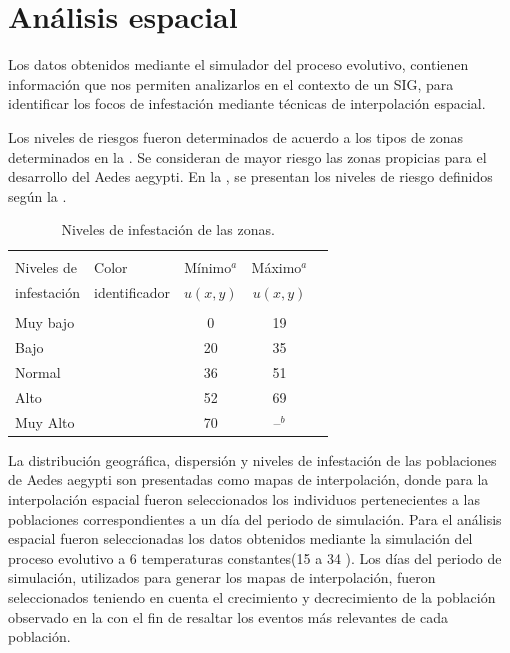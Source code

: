 \section {Análisis espacial}

Los datos obtenidos mediante el simulador del proceso evolutivo, contienen información que nos
permiten analizarlos en el contexto de un SIG, para identificar los focos de infestación mediante
técnicas de interpolación espacial.

Los niveles de riesgos fueron determinados de acuerdo a los tipos de zonas determinados en la
. Se consideran de mayor riesgo las zonas propicias para el
desarrollo del Aedes aegypti. En la , se presentan los niveles de
riesgo definidos según la .


\begin{table}[!hptb]
    \begin{minipage}{\textwidth}
\begin{center}
    \caption{\label{tab:niveles-riesgo-zonas} Niveles de infestación de las zonas.}
    \begin{tabular}{p{3cm} l c c c}
        \hline \\
         Niveles de  & Color & Mínimo$^a$ & Máximo$^a$ \\
         infestación & identificador & $u(x,y)$   & $u(x,y)$  \\
        \hline
        \hline\\
        Muy bajo  & \cellcolor{muybajo}& 0  & 19 \\
        Bajo    & \cellcolor{bajo}& 20 & 35 \\
        Normal & \cellcolor{normal}& 36 & 51 \\
        Alto   & \cellcolor{alto}& 52 & 69 \\
        Muy Alto & \cellcolor{muyalto} & 70 & --$^b$\\
    \end{tabular}
\end{center}
    \end{minipage}
\end{table}

La distribución geográfica, dispersión y niveles de infestación de las poblaciones de Aedes aegypti
son presentadas como mapas de interpolación, donde para la interpolación espacial fueron
seleccionados los individuos pertenecientes a las poblaciones correspondientes a un día del
periodo de simulación. Para el análisis espacial fueron seleccionadas los datos obtenidos mediante
la simulación del proceso evolutivo a 6 temperaturas constantes(15 a 34 \textcelsius). Los días
del periodo de simulación, utilizados para generar los mapas de interpolación, fueron
seleccionados teniendo en cuenta el crecimiento y decrecimiento de la población observado en
la  con el fin de resaltar los eventos más relevantes de cada
población.

